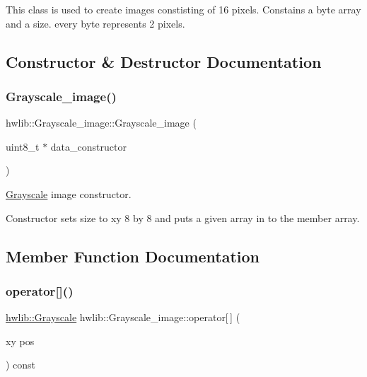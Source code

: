 This class is used to create images constisting of 16 pixels. Constains a byte array and a size. every byte represents 2 pixels. 

\subsection{Constructor \& Destructor Documentation}
\mbox{\label{classhwlib_1_1Grayscale__image_a852771dc5a7ea93f9420f6d5b0e9262a}} 
\subsubsection{\texorpdfstring{Grayscale\+\_\+image()}{Grayscale\_image()}}
{\footnotesize\ttfamily hwlib\+::\+Grayscale\+\_\+image\+::\+Grayscale\+\_\+image (\begin{DoxyParamCaption}\item[{uint8\+\_\+t $\ast$}]{data\+\_\+constructor }\end{DoxyParamCaption})\hspace{0.3cm}{\ttfamily [inline]}}



\hyperlink{classhwlib_1_1Grayscale}{Grayscale} image constructor. 

Constructor sets size to xy 8 by 8 and puts a given array in to the member array. 

\subsection{Member Function Documentation}
\mbox{\label{classhwlib_1_1Grayscale__image_a57639aedc8bd30a417d51b7a2d01bcf3}} 
\subsubsection{\texorpdfstring{operator[]()}{operator[]()}}
{\footnotesize\ttfamily \hyperlink{classhwlib_1_1Grayscale}{hwlib\+::\+Grayscale} hwlib\+::\+Grayscale\+\_\+image\+::operator\mbox{[}$\,$\mbox{]} (\begin{DoxyParamCaption}\item[{xy}]{pos }\end{DoxyParamCaption}) const}




